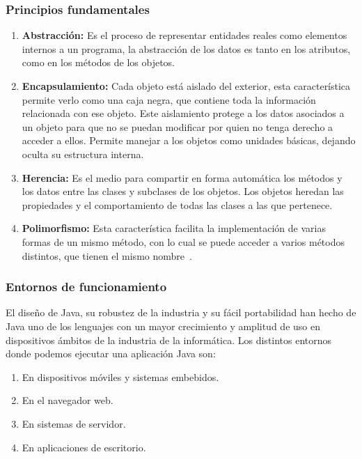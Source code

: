 \subsubsection{Principios fundamentales}
\begin{enumerate}
\item \textbf{Abstracción:}
Es el proceso de representar entidades reales como elementos
 internos a un programa, la abstracción de los datos es tanto en los atributos, 
como en los métodos de los objetos.
\item \textbf{Encapsulamiento:}
Cada objeto está aislado del exterior, esta característica permite verlo 
como una caja negra, que contiene toda la información relacionada con ese
 objeto. Este aislamiento protege a los datos asociados a un objeto para
 que no se puedan modificar por quien no tenga derecho a acceder a ellos.
Permite manejar a los objetos como unidades básicas, dejando oculta su
 estructura interna.
\item \textbf{Herencia:}
Es el medio para compartir en forma automática los métodos y los datos 
entre las clases y subclases de los objetos. Los objetos heredan las
 propiedades y el comportamiento de todas las clases a las que pertenece.
\item \textbf{Polimorfismo:}
Esta característica facilita la implementación de varias formas de un mismo método,
 con lo cual se puede acceder a varios métodos distintos, que tienen el mismo
 nombre~\cite{JAVA}.
\end{enumerate}
\subsubsection{Entornos de funcionamiento}
	
El diseño de Java, su robustez de la industria y su fácil portabilidad han 
hecho de Java uno de los lenguajes con un mayor crecimiento y amplitud de
 uso en dispositivos ámbitos de la industria de la informática. Los distintos
 entornos donde podemos ejecutar una aplicación Java son:
\begin{enumerate}
\item	En dispositivos móviles y sistemas embebidos.
\item	En el navegador web.
\item	En sistemas de servidor.
\item	En aplicaciones de escritorio.
\end{enumerate}
